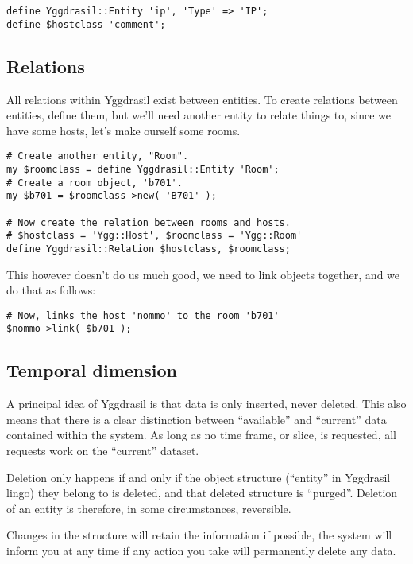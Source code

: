\documentclass[english,a4paper]{article}
\begin{document}
\lstset{caption=Defining properties,label=properties}
\begin{lstlisting}
define Yggdrasil::Entity 'ip', 'Type' => 'IP';
define $hostclass 'comment';
\end{lstlisting}

\subsection{Relations}

All relations within Yggdrasil exist between entities.  To create
relations between entities, define them, but we'll need another entity
to relate things to, since we have some hosts, let's make ourself some
rooms.

\lstset{caption=Defining relations,label=relations}
\begin{lstlisting}
# Create another entity, "Room".
my $roomclass = define Yggdrasil::Entity 'Room';
# Create a room object, 'b701'.
my $b701 = $roomclass->new( 'B701' );

# Now create the relation between rooms and hosts.
# $hostclass = 'Ygg::Host', $roomclass = 'Ygg::Room'
define Yggdrasil::Relation $hostclass, $roomclass; 
\end{lstlisting}

This however doesn't do us much good, we need to link objects
together, and we do that as follows:

\lstset{caption=Linking ``nommo'' to ``b701'',label=linking}
\begin{lstlisting}
# Now, links the host 'nommo' to the room 'b701'
$nommo->link( $b701 );
\end{lstlisting}
 
\subsection{Temporal dimension}

A principal idea of Yggdrasil is that data is only inserted, never
deleted.  This also means that there is a clear distinction between
``available'' and ``current'' data contained within the system.
As long as no time frame, or slice, is requested, all requests work on
the ``current'' dataset. 

Deletion only happens if and only if the object structure (``entity''
in Yggdrasil lingo) they belong to is deleted, and that deleted
structure is ``purged''.  Deletion of an entity is therefore, in some
circumstances, reversible.

Changes in the structure will retain the information if possible, the
system will inform you at any time if any action you take will
permanently delete any data.
\end{document}
